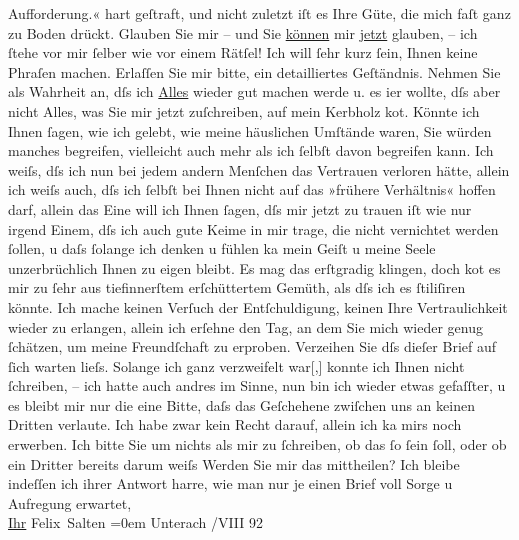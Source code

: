 \begin{ledgroupsized}[t]{13cm}
{{{                     Aufforderung.«}}}\label{K_L03112-2h} hart geſtraft, und nicht zuletzt iſt es Ihre
               Güte, die mich faſt ganz zu Boden drückt. Glauben Sie mir – und Sie \uline{können} mir \uline{jetzt}
               glauben, – ich ſtehe vor mir ſelber wie vor einem Rätſel! Ich will ſehr kurz ſein,
               Ihnen keine Phraſen machen. Erlaſſen Sie mir bitte, ein detailliertes Geſtänd{\pb}nis. Nehmen Sie als
               Wahrheit an, dſs ich \uline{Alles} wieder gut machen werde u.
               es i{\geminationm}er wollte, dſs aber nicht Alles, was Sie mir jetzt
               zuſchreiben, auf mein Kerbholz ko{\geminationm}t. Könnte ich Ihnen
               ſagen, wie ich gelebt, wie meine häuslichen Umſtände waren, Sie würden manches
               begreifen, vielleicht auch mehr als ich ſelbſt davon begreifen kann.\pend
           \pstart
           Ich weiſs, dſs ich nun bei jedem andern Menſchen das Vertrauen verloren hätte, allein
               ich weiſs auch, dſs ich ſelbſt bei Ihnen nicht {\pb}auf das »frühere Verhältnis«
               hoffen darf, allein das Eine will ich Ihnen ſagen, dſs mir jetzt zu trauen iſt wie
               nur irgend Einem, dſs ich auch gute Keime in mir trage, die nicht vernichtet werden
               ſollen, u daſs ſolange ich denken u fühlen ka{\geminationn} mein
               Geiſt u meine Seele unzerbrüchlich Ihnen zu eigen bleibt.\pend
           \pstart
           Es mag das erſtgradig klingen, doch ko{\geminationm}t es mir zu ſehr
               aus tiefinnerſtem erſchüttertem Gemüth, als dſs ich es ſtiliſiren könnte.\pend
           \pstart
           Ich mache keinen Verſuch der Entſchuldigung, keinen Ihre Vertraulichkeit wieder zu
                  er{\pb}langen, allein ich
               erſehne den Tag, an dem Sie mich wieder genug ſchätzen, um meine Freundſchaft zu
               erproben.\pend
           \pstart
           Verzeihen Sie dſs dieſer Brief auf ſich warten lieſs. Solange ich ganz verzweifelt
                  war{[},{]} konnte ich Ihnen nicht ſchreiben, – ich hatte auch
               andres im Sinne, nun bin ich wieder etwas gefaſſter, u es bleibt mir nur die eine
               Bitte, daſs das Geſchehene zwiſchen uns an keinen Dritten verlaute. Ich habe zwar
               kein Recht darauf, allein ich ka{\geminationn} mirs noch erwerben.
               Ich bitte Sie um nichts als mir zu ſchreiben, ob das ſo ſein ſoll, oder ob ein {\pb}Dritter bereits darum
               weiſs\pend
           \pstart
           Werden Sie mir das mittheilen?\pend
           \pstart
           Ich bleibe indeſſen ich ihrer Antwort harre, wie man nur je einen Brief voll
               Sorge u Aufregung erwartet, {\\[\baselineskip]}\uline{Ihr}{ }\spacefill\mbox{Felix Salten}\pend
           \leftskip=0em{}\pstart
           \noindent{}Unterach\pend
           /VIII 92\pend
           
         
         \endnumbering{}\end{ledgroupsized}  \newcommand{\dateiname}{L03112}\newcommand{\titel}{Felix Salten an Arthur Schnitzler, 17. 8. 1892}\newcommand{\editorInnen}{Martin Anton Müller und Laura Untner}
      